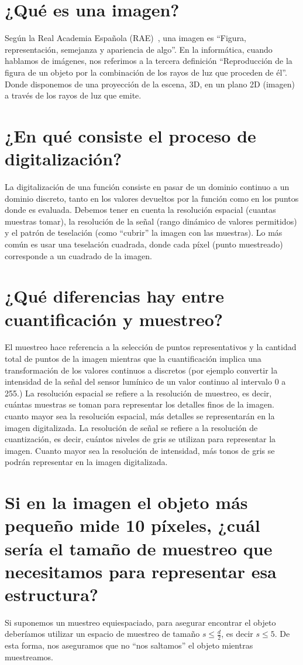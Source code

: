\documentclass[12pt,letterpaper]{article}
\begin{document}
\hypertarget{Indice}{}
\tableofcontents
\newpage
\section{¿Qué es una imagen?}
Según la Real Academia Española (RAE)~\cite{RAE}, una imagen es ``Figura, representación, semejanza y apariencia de algo''.
En la informática, cuando hablamos de imágenes, nos referimos a la tercera definición ``Reproducción de la figura de un objeto por la combinación de los rayos de luz que proceden de él''.
Donde disponemos de una proyección de la escena, 3D, en un plano 2D (imagen) a través de los rayos de luz que emite.
\section{¿En qué consiste el proceso de digitalización?}
La digitalización de una función consiste en pasar de un dominio continuo a un dominio discreto, tanto en los valores devueltos por la función como en los puntos donde es evaluada.
Debemos tener en cuenta la resolución espacial (cuantas muestras tomar), la resolución de la señal (rango dinámico de valores permitidos) y el patrón de teselación (como ``cubrir'' la imagen con las muestras).
Lo más común es usar una teselación cuadrada, donde cada píxel (punto muestreado) corresponde a un cuadrado de la imagen.
\section{¿Qué diferencias hay entre cuantificación y muestreo?}
El muestreo hace referencia a la selección de puntos representativos y la cantidad total de puntos de la imagen mientras que la cuantificación implica una transformación de los valores continuos a discretos (por ejemplo convertir la intensidad de la señal del sensor lumínico de un valor continuo al intervalo 0 a 255.)
La resolución espacial se refiere a la resolución de muestreo, es decir, cuántas muestras se toman para representar los detalles finos de la imagen. cuanto mayor sea la resolución espacial, más detalles se representarán en la imagen digitalizada.
La resolución de señal se refiere a la resolución de cuantización, es decir, cuántos niveles de gris se utilizan para representar la imagen. Cuanto mayor sea la resolución de intensidad, más tonos de gris se podrán representar en la imagen digitalizada.
\section{Si en la imagen el objeto más pequeño mide 10 píxeles, ¿cuál sería el tamaño de muestreo que necesitamos para representar esa estructura?}
Si suponemos un muestreo equiespaciado, para asegurar encontrar el objeto deberíamos utilizar un espacio de muestreo de tamaño $s \leq \frac{d}{2}$, es decir $s \leq 5$. 
De esta forma, nos aseguramos que no ``nos saltamos'' el objeto mientras muestreamos.
\end{document}
